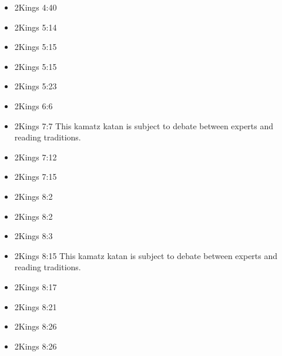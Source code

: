 \documentclass[14pt]{article}
\begin{document}
\begin{multicols}{2}
\begin{itemize}
													\item 2Kings 4:40
													
													\item 2Kings 5:14
													
													\item 2Kings 5:15
													
													\item 2Kings 5:15
													
													\item 2Kings 5:23
													
													\item 2Kings 6:6
													
													\item 2Kings 7:7 This kamatz katan is subject to debate between experts and reading traditions.
													
													\item 2Kings 7:12
													
													\item 2Kings 7:15
													
													\item 2Kings 8:2
													
													\item 2Kings 8:2
													
													\item 2Kings 8:3
													
													\item 2Kings 8:15 This kamatz katan is subject to debate between experts and reading traditions.
													
													\item 2Kings 8:17
													
													\item 2Kings 8:21
													
													\item 2Kings 8:26
													
													\item 2Kings 8:26
													

\end{itemize}
\end{multicols}
\end{document}
